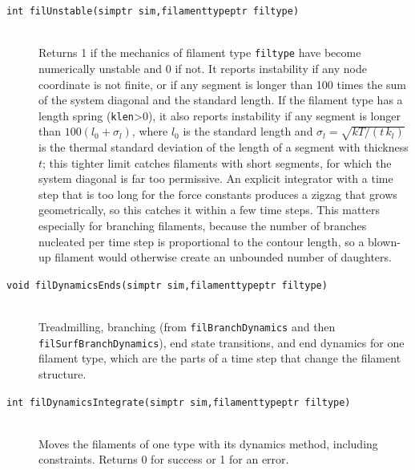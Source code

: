 \documentclass {scrbook}
\newcommand {\ttt} {\texttt}
\begin{document}
\begin{description}
\item[\ttt{int filUnstable(simptr sim,filamenttypeptr filtype)}]
\hfill \\
Returns 1 if the mechanics of filament type \ttt{filtype} have become numerically unstable and 0 if not. It reports instability if any node coordinate is not finite, or if any segment is longer than 100 times the sum of the system diagonal and the standard length. If the filament type has a length spring (\ttt{klen}>0), it also reports instability if any segment is longer than $100(l_0+\sigma_l)$, where $l_0$ is the standard length and $\sigma_l=\sqrt{kT/(t\,k_l)}$ is the thermal standard deviation of the length of a segment with thickness $t$; this tighter limit catches filaments with short segments, for which the system diagonal is far too permissive. An explicit integrator with a time step that is too long for the force constants produces a zigzag that grows geometrically, so this catches it within a few time steps. This matters especially for branching filaments, because the number of branches nucleated per time step is proportional to the contour length, so a blown-up filament would otherwise create an unbounded number of daughters.

\item[\ttt{void filDynamicsEnds(simptr sim,filamenttypeptr filtype)}] %
\hfill \\
Treadmilling, branching (from \ttt{filBranchDynamics} and then \ttt{filSurfBranchDynamics}), end state transitions, and end dynamics for one filament type, which are the parts of a time step that change the filament structure.

\item[\ttt{int filDynamicsIntegrate(simptr sim,filamenttypeptr filtype)}] %
\hfill \\
Moves the filaments of one type with its dynamics method, including constraints. Returns 0 for success or 1 for an error.


\end{description}
\end{document}
